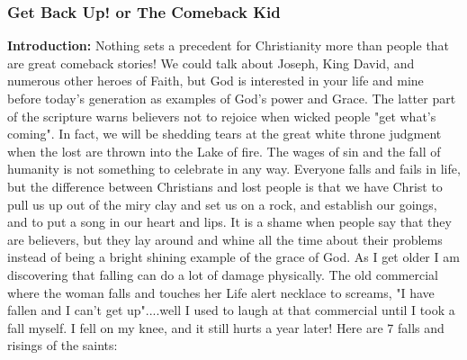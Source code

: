 \subsubsection{Get Back Up! or The Comeback Kid}
\textbf{Introduction:} Nothing sets a precedent for Christianity more than people that are great comeback stories!  We could talk about Joseph, King David, and numerous other heroes of Faith, but God is interested in your life and mine before today's generation as examples of God's power and Grace. The latter part of the scripture warns believers not to rejoice when wicked people "get what's coming".  In fact, we will be shedding tears at the great white throne judgment when the lost are thrown into the Lake of fire.  The wages of sin and the fall of humanity is not something to celebrate in any way. Everyone falls and fails in life,  but the difference between Christians and lost people is that we have Christ to pull us up out of the miry clay and set us on a rock, and establish our goings, and to put a song in our heart and lips. It is a shame when people say that they are believers, but they lay around and whine all the time about their problems instead of being a bright shining example of the grace of God. As I get older I am discovering that falling can do a lot of damage physically.  The old commercial where the woman falls and touches her Life alert necklace to screams,  "I have fallen and I can't get up"....well I used to laugh at that commercial until I took a fall myself. I fell on my knee, and it still hurts a year later! Here are 7 falls and risings of the saints:\\
